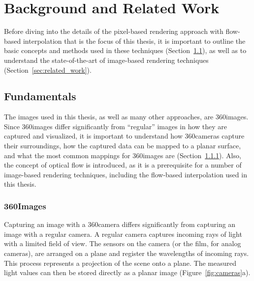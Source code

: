 \chapter{Background and Related Work}
Before diving into the details of the pixel-based rendering approach with flow-based interpolation that is the focus of this thesis, it is important to outline the basic concepts and methods used in these techniques (Section~\ref{sec:fundamentals}), as well as to understand the state-of-the-art of image-based rendering techniques (Section~\ref{sec:related_work}).

\section{Fundamentals}\label{sec:fundamentals}
The images used in this thesis, as well as many other approaches, are 360\degree images. Since 360\degree images differ significantly from ``regular'' images in how they are captured and visualized, it is important to understand how 360\degree cameras capture their surroundings, how the captured data can be mapped to a planar surface, and what the most common mappings for 360\degree images are (Section~\ref{subsec:fundamentals_360}). Also, the concept of optical flow is introduced, as it is a prerequisite for a number of image-based rendering techniques, including the flow-based interpolation used in this thesis.

\subsection{360\degree Images}\label{subsec:fundamentals_360}
Capturing an image with a 360\degree camera differs significantly from capturing an image with a regular camera. A regular camera captures incoming rays of light with a limited field of view. The sensors on the camera (or the film, for analog cameras), are arranged on a plane and register the wavelengths of incoming rays. This process represents a projection of the scene onto a plane. The measured light values can then be stored directly as a planar image (Figure~\ref{fig:cameras}a).


